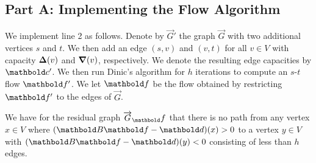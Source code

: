 \documentclass[nobib]{tufte-handout}
\newcommand{\flowgraph}{\overrightarrow{G}}
\newcommand{\altflowgraph}{\flowgraph'}
\newcommand{\resflowgraph}{\flowgraph_\vf}
\begin{document}
\subsection{Part A: Implementing the Flow Algorithm}
We implement line 2 as follows. Denote by $\altflowgraph$ the graph $\flowgraph$ with two additional vertices $s$ and $t$. We then add an edge $(s,v)$ and $(v,t)$ for all $v \in V$ with capacity $\vDelta(v)$ and $\boldsymbol{\nabla}(v)$, respectively. We denote the resulting edge capacities by $\vc'$. We then run Dinic's algorithm for $h$ iterations to compute an $s$-$t$ flow $\vf'$. We let $\vf$ be the flow obtained by restricting $\vf'$ to the edges of $\flowgraph$.

\begin{lem}\label{lem:1:A:1}
We have for the residual graph $\resflowgraph$ that there is no path from any vertex $x \in V$ where $(\mB\vf - \vd)(x) > 0$ to a vertex $y \in V$ with $(\mB\vf - \vd)(y) < 0$ consisting of less than $h$ edges.
\end{lem}
\end{document}
